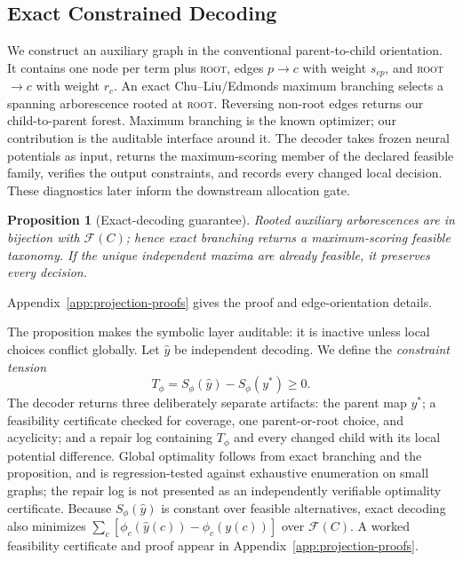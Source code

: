 \documentclass[11pt]{article}
\newtheorem{proposition}{Proposition}
\newcommand{\rootnode}{\textsc{root}}
\begin{document}
\subsection{Exact Constrained Decoding}

We construct an auxiliary graph in the conventional parent-to-child
orientation.  It contains one node per term plus \rootnode{}, edges
$p\rightarrow c$ with weight $s_{cp}$, and \rootnode$\rightarrow c$ with
weight $r_c$.  An exact Chu--Liu/Edmonds maximum branching
\citep{edmonds1967optimum} selects a spanning arborescence rooted at
\rootnode{}.  Reversing non-root edges returns our child-to-parent forest.
Maximum branching is the known optimizer; our contribution is the auditable
interface around it. The decoder takes frozen neural potentials as input,
returns the maximum-scoring member of the declared feasible family, verifies
the output constraints, and records every changed local decision. These
diagnostics later inform the downstream allocation gate.

\begin{proposition}[Exact-decoding guarantee]
Rooted auxiliary arborescences are in bijection with $\mathcal F(C)$; hence exact
branching returns a maximum-scoring feasible taxonomy. If the unique
independent maxima are already feasible, it preserves every decision.
\end{proposition}
Appendix~\ref{app:projection-proofs} gives the proof and edge-orientation
details.

The proposition makes the symbolic layer auditable: it is inactive unless local
choices conflict globally. Let $\hat y$ be independent decoding. We define
the \emph{constraint tension}
\begin{equation}
T_\phi=S_\phi(\hat y)-S_\phi(y^*)\geq 0.
\label{eq:tension}
\end{equation}
The decoder returns three deliberately separate artifacts: the parent map
$y^*$; a feasibility certificate checked for coverage, one parent-or-root choice,
and acyclicity; and a repair log containing $T_\phi$ and every changed child
with its local potential difference. Global optimality follows from exact
branching and the proposition, and is regression-tested against exhaustive
enumeration on small graphs; the repair log is not presented as an
independently verifiable optimality certificate. Because $S_\phi(\hat y)$ is
constant over feasible alternatives, exact decoding also minimizes
$\sum_c[\phi_c(\hat y(c))-\phi_c(y(c))]$ over $\mathcal F(C)$. A worked
feasibility certificate and proof appear in Appendix~\ref{app:projection-proofs}.
\end{document}
